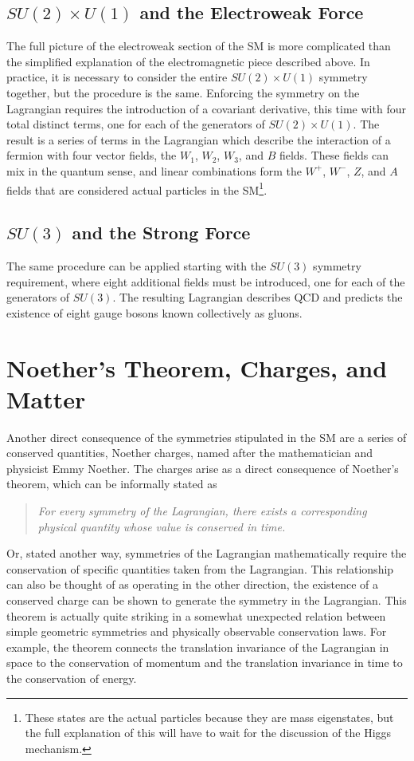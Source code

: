 \subsection{$SU(2)\times U(1)$ and the Electroweak Force}

The full picture of the electroweak section of the \ac{SM} is more complicated than the simplified explanation of the electromagnetic piece described above. 
In practice, it is necessary to consider the entire $SU(2)\times U(1)$ symmetry together, but the procedure is the same.
Enforcing the symmetry on the Lagrangian requires the introduction of a covariant derivative, this time with four total distinct terms, one for each of the generators of $SU(2)\times U(1)$.
The result is a series of terms in the Lagrangian which describe the interaction of a fermion with four vector fields, the $W_1$, $W_2$, $W_3$, and $B$ fields.
These fields can mix in the quantum sense, and linear combinations form the $W^+$, $W^-$, $Z$, and $A$ fields that are considered actual particles in the \ac{SM}\footnote{These states are the actual particles because they are mass eigenstates, but the full explanation of this will have to wait for the discussion of the Higgs mechanism.}.

\subsection{$SU(3)$ and the Strong Force}

The same procedure can be applied starting with the $SU(3)$ symmetry requirement, where eight additional fields must be introduced, one for each of the generators of $SU(3)$.
The resulting Lagrangian describes \ac{QCD} and predicts the existence of eight gauge bosons known collectively as gluons. 

\section{Noether's Theorem, Charges, and Matter}

Another direct consequence of the symmetries stipulated in the \ac{SM} are a series of conserved quantities, Noether charges, named after the mathematician and physicist Emmy Noether.
The charges arise as a direct consequence of Noether's theorem, which can be informally stated as 
\begin{quote}
\textit{For every symmetry of the Lagrangian, there exists a corresponding physical quantity whose value is conserved in time.}
\end{quote}
\noindent Or, stated another way, symmetries of the Lagrangian mathematically require the conservation of specific quantities taken from the Lagrangian. 
This relationship can also be thought of as operating in the other direction, the existence of a conserved charge can be shown to generate the symmetry in the Lagrangian.
This theorem is actually quite striking in a somewhat unexpected relation between simple geometric symmetries and physically observable conservation laws. 
For example, the theorem connects the translation invariance of the Lagrangian in space to the conservation of momentum and the translation invariance in time to the conservation of energy. 

